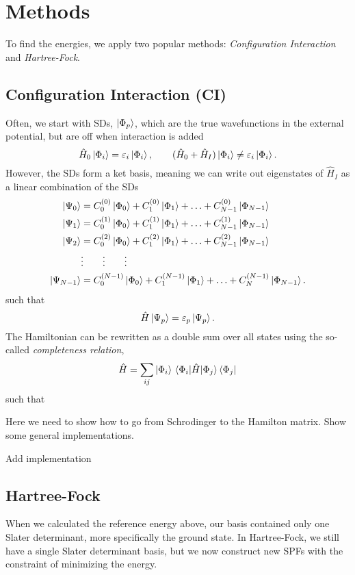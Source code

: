 \section{Methods} \label{sec:methods}
To find the energies, we apply two popular methods: \textit{Configuration Interaction} and \textit{Hartree-Fock}.
\subsection{Configuration Interaction (CI)}
Often, we start with SDs, $\ket{\Phi_p}$, which are the true wavefunctions in the external potential, but are off when interaction is added
\begin{equation}
\hat{H}_0\ket{\Phi_i}=\varepsilon_i\ket{\Phi_i},\qquad (\hat{H}_0+\hat{H}_I)\ket{\Phi_i}\neq\varepsilon_i\ket{\Phi_i}.
\end{equation}
However, the SDs form a ket basis, meaning we can write out eigenstates of $\hat{H}_I$ as a linear combination of the SDs
\begin{align}
\ket{\Psi_0}&=C_0^{(0)}\ket{\Phi_0}+C_1^{(0)}\ket{\Phi_1}+\hdots+C_{N-1}^{(0)}\ket{\Phi_{N-1}}\notag\\
\ket{\Psi_1}&=C_0^{(1)}\ket{\Phi_0}+C_1^{(1)}\ket{\Phi_1}+\hdots+C_{N-1}^{(1)}\ket{\Phi_{N-1}}\notag\\
\ket{\Psi_2}&=C_0^{(2)}\ket{\Phi_0}+C_1^{(2)}\ket{\Phi_1}+\hdots+C_{N-1}^{(2)}\ket{\Phi_{N-1}}\\
&\vdots\qquad\vdots\qquad\vdots\notag\\
\ket{\Psi_{N-1}}&=C_0^{(N-1)}\ket{\Phi_0}+C_1^{(N-1)}\ket{\Phi_1}+\hdots+C_N^{(N-1)}\ket{\Phi_{N-1}}.\notag
\end{align}
such that 
\begin{equation}
\hat{H}\ket{\Psi_p}=\varepsilon_p\ket{\Psi_p}.
\end{equation}
The Hamiltonian can be rewritten as a double sum over all states using the so-called \textit{completeness relation}, 
\begin{equation}
\hat{H}=\sum_{ij}\ket{\Phi_i}\mel{\Phi_i}{\hat{H}}{\Phi_j}\bra{\Phi_j}
\end{equation}
such that

Here we need to show how to go from Schrodinger to the Hamilton matrix. Show some general implementations.

Add implementation

\subsection{Hartree-Fock}
When we calculated the reference energy above, our basis contained only one Slater determinant, more specifically the ground state. In Hartree-Fock, we still have a single Slater determinant basis, but we now construct new SPFs with the constraint of minimizing the energy. 


